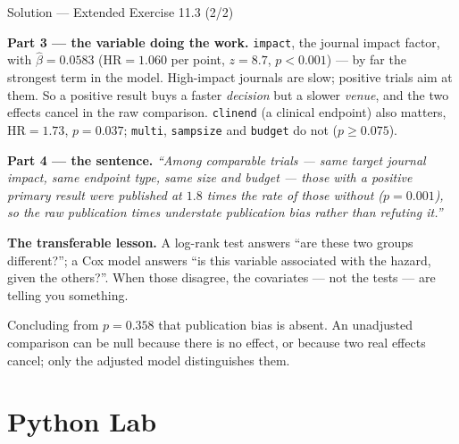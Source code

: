 \documentclass[aspectratio=169,11pt]{beamer}
\begin{document}
\begin{frame}{Solution --- Extended Exercise 11.3 (2/2)}
  \footnotesize
\begin{solutionbox}
  \scriptsize
  \textbf{Part 3 --- the variable doing the work.} \texttt{impact}, the journal impact
  factor, with $\hat\beta=0.0583$ ($\mathrm{HR}=1.060$ per point, $z=8.7$,
  $p<0.001$) --- by far the strongest term in the model. High-impact journals are slow;
  positive trials aim at them. So a positive result buys a faster \emph{decision} but a
  slower \emph{venue}, and the two effects cancel in the raw comparison.
  \texttt{clinend} (a clinical endpoint) also matters, $\mathrm{HR}=1.73$, $p=0.037$;
  \texttt{multi}, \texttt{sampsize} and \texttt{budget} do not ($p\ge0.075$).

  \medskip
  \textbf{Part 4 --- the sentence.} \emph{``Among comparable trials --- same target
  journal impact, same endpoint type, same size and budget --- those with a positive
  primary result were published at $1.8$ times the rate of those without
  ($p=0.001$), so the raw publication times understate publication bias rather than
  refuting it.''}

  \medskip
  \textbf{The transferable lesson.} A log-rank test answers ``are these two groups
  different?''; a Cox model answers ``is this variable associated with the hazard, given
  the others?''. When those disagree, the covariates --- not the tests --- are telling
  you something.
\end{solutionbox}
\begin{mistake}
  Concluding from $p=0.358$ that publication bias is absent. An unadjusted comparison
  can be null because there is no effect, or because two real effects cancel; only the
  adjusted model distinguishes them.
\end{mistake}
\end{frame}

\section{Python Lab}
\end{document}

